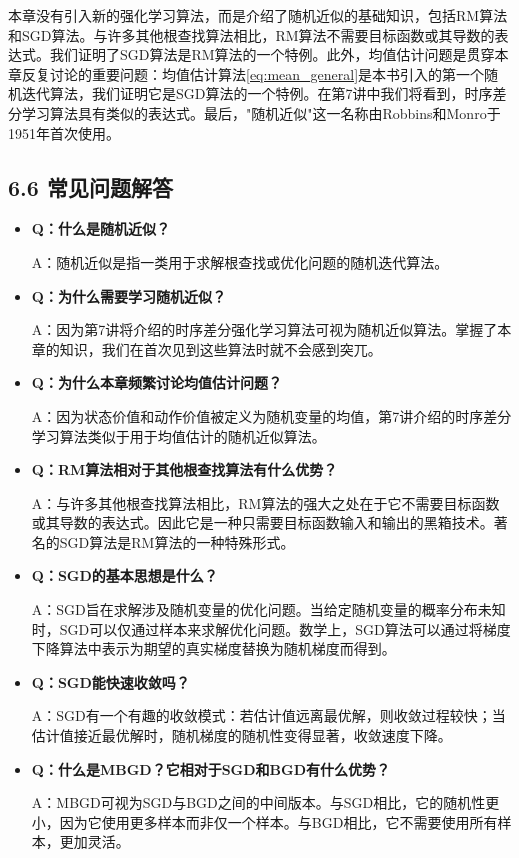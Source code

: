 \documentclass[UTF8]{article}
\begin{document}
本章没有引入新的强化学习算法，而是介绍了随机近似的基础知识，包括RM算法和SGD算法。与许多其他根查找算法相比，RM算法不需要目标函数或其导数的表达式。我们证明了SGD算法是RM算法的一个特例。此外，均值估计问题是贯穿本章反复讨论的重要问题：均值估计算法\eqref{eq:mean_general}是本书引入的第一个随机迭代算法，我们证明它是SGD算法的一个特例。在第7讲中我们将看到，时序差分学习算法具有类似的表达式。最后，"随机近似"这一名称由Robbins和Monro于1951年首次使用。

\subsection*{6.6 常见问题解答}

\begin{itemize}
    \item \textbf{Q：什么是随机近似？}

    A：随机近似是指一类用于求解根查找或优化问题的随机迭代算法。

    \item \textbf{Q：为什么需要学习随机近似？}

    A：因为第7讲将介绍的时序差分强化学习算法可视为随机近似算法。掌握了本章的知识，我们在首次见到这些算法时就不会感到突兀。

    \item \textbf{Q：为什么本章频繁讨论均值估计问题？}

    A：因为状态价值和动作价值被定义为随机变量的均值，第7讲介绍的时序差分学习算法类似于用于均值估计的随机近似算法。

    \item \textbf{Q：RM算法相对于其他根查找算法有什么优势？}

    A：与许多其他根查找算法相比，RM算法的强大之处在于它不需要目标函数或其导数的表达式。因此它是一种只需要目标函数输入和输出的黑箱技术。著名的SGD算法是RM算法的一种特殊形式。

    \item \textbf{Q：SGD的基本思想是什么？}

    A：SGD旨在求解涉及随机变量的优化问题。当给定随机变量的概率分布未知时，SGD可以仅通过样本来求解优化问题。数学上，SGD算法可以通过将梯度下降算法中表示为期望的真实梯度替换为随机梯度而得到。

    \item \textbf{Q：SGD能快速收敛吗？}

    A：SGD有一个有趣的收敛模式：若估计值远离最优解，则收敛过程较快；当估计值接近最优解时，随机梯度的随机性变得显著，收敛速度下降。

    \item \textbf{Q：什么是MBGD？它相对于SGD和BGD有什么优势？}

    A：MBGD可视为SGD与BGD之间的中间版本。与SGD相比，它的随机性更小，因为它使用更多样本而非仅一个样本。与BGD相比，它不需要使用所有样本，更加灵活。
\end{itemize}
\end{document}
